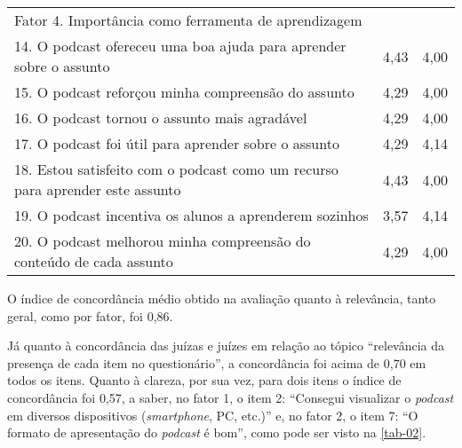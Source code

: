 \begin{table}[htpb]
\begin{threeparttable}
\begin{tabular}{p{10cm} l l}
Fator 4. Importância como ferramenta de aprendizagem &  &  \\	
14. O podcast ofereceu uma boa ajuda para aprender sobre o assunto & 4,43 & 4,00 \\
15. O podcast reforçou minha compreensão do assunto & 4,29 & 4,00 \\
16. O podcast tornou o assunto mais agradável & 4,29 & 4,00 \\
17. O podcast foi útil para aprender sobre o assunto & 4,29 & 4,14 \\
18. Estou satisfeito com o podcast como um recurso para aprender este assunto & 4,43 & 4,00 \\
19. O podcast incentiva os alunos a aprenderem sozinhos & 3,57 & 4,14 \\
20. O podcast melhorou minha compreensão do conteúdo de cada assunto & 4,29 & 4,00 \\
\bottomrule
\end{tabular}
\end{threeparttable}
\end{table}

O índice de concordância médio obtido na avaliação quanto à relevância, tanto
geral, como por fator, foi 0,86.

Já quanto à concordância das juízas e juízes em relação ao tópico
\enquote{relevância da presença de cada item no questionário}, a concordância
foi acima de 0,70 em todos os itens. Quanto à clareza, por sua vez, para dois
itens o índice de concordância foi 0,57, a saber, no fator 1, o item 2:
\enquote{Consegui visualizar o \textit{podcast} em diversos dispositivos
(\textit{smartphone}, PC, etc.)} e, no fator 2, o item 7: \enquote{O formato de
apresentação do \textit{podcast} é bom}, como pode ser visto na \cref{tab-02}.



